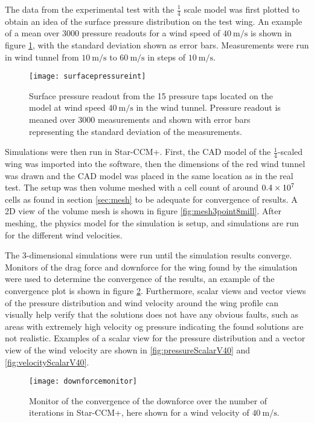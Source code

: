   The data from the experimental test with the $\frac{1}{4}$ scale model was first plotted to obtain an idea of the surface pressure distribution on the test wing. An example of a mean over 3000 pressure readouts for a wind speed of $\SI{40}{\metre\per\second}$ is shown in figure \ref{fig:surfacepressureint}, with the standard deviation shown as error bars. Measurements were run in wind tunnel from $\SI{10}{\metre\per\second}$ to $\SI{60}{\metre\per\second}$ in steps of $\SI{10}{\metre\per\second}$.

  \begin{figure}
    \texttt{[image: surfacepressureint]}
    \caption{Surface pressure readout from the 15 pressure taps located on the model at wind speed $\SI{40}{\metre\per\second}$ in the wind tunnel. Pressure readout is meaned over 3000 measurements and shown with error bars representing the standard deviation of the measurements.}
    \label{fig:surfacepressureint}
  \end{figure}

  Simulations were then run in Star-CCM+. First, the CAD model of the $\frac{1}{4}$-scaled wing was imported into the software, then the dimensions of the red wind tunnel was drawn and the CAD model was placed in the same location as in the real test. The setup was then volume meshed with a cell count of around $\SI{.4E7}{}$ cells as found in section \ref{sec:mesh} to be adequate for convergence of results. A 2D view of the volume mesh is shown in figure \ref{fig:mesh3point8mill}. After meshing, the physics model for the simulation is setup, and simulations are run for the different wind velocities.

  The 3-dimensional simulations were run until the simulation results converge. Monitors of the drag force and downforce for the wing found by the simulation were used to determine the convergence of the results, an example of the convergence plot is shown in figure \ref{fig:downforcemonitor}. Furthermore, scalar views and vector views of the pressure distribution and wind velocity around the wing profile can visually help verify that the solutions does not have any obvious faults, such as areas with extremely high velocity og pressure indicating the found solutions are not realistic. Examples of a scalar view for the pressure distribution and a vector view of the wind velocity are shown in \ref{fig:pressureScalarV40} and \ref{fig:velocityScalarV40}.

  \begin{figure}
    \centering
    \texttt{[image: downforcemonitor]}
    \caption{Monitor of the convergence of the downforce over the number of iterations in Star-CCM+, here shown for a wind velocity of $\SI{40}{\metre\per\second}$.}
    \label{fig:downforcemonitor}
  \end{figure}

